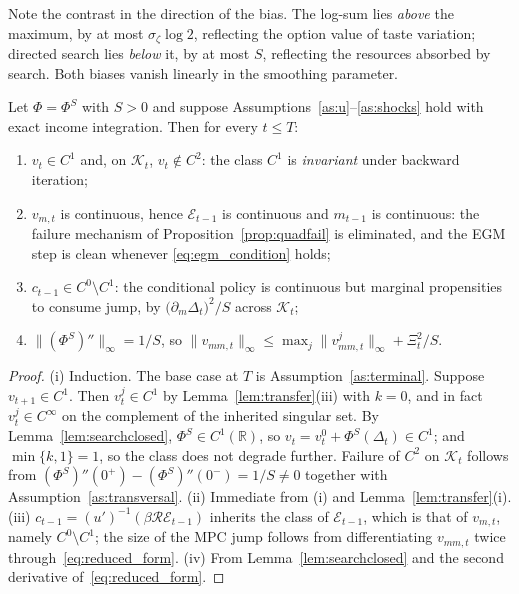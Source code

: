 Note the contrast in the direction of the bias. The log-sum lies \emph{above} the
maximum, by at most $\sigma_\zeta\log 2$, reflecting the option value of taste
variation; directed search lies \emph{below} it, by at most $S$, reflecting the
resources absorbed by search. Both biases vanish linearly in the smoothing parameter.

\begin{proposition}
\label{prop:search}
Let $\Phi=\Phi^{S}$ with $S>0$ and suppose
Assumptions~\ref{as:u}--\ref{as:shocks} hold with exact income integration. Then for
every $t\le T$:
\begin{enumerate}
    \item $v_t\in C^{1}$ and, on $\mathcal{K}_t$, $v_t\notin C^{2}$: the class $C^{1}$
    is \emph{invariant} under backward iteration;
    \item $v_{m,t}$ is continuous, hence $\mathcal{E}_{t-1}$ is continuous and
    $m_{t-1}$ is continuous: the failure mechanism of
    Proposition~\ref{prop:quadfail} is eliminated, and the EGM step is clean whenever
    \eqref{eq:egm_condition} holds;
    \item $c_{t-1}\in C^{0}\setminus C^{1}$: the conditional policy is continuous but
    marginal propensities to consume jump, by
    $\big(\partial_m\Delta_t\big)^{2}/S$ across $\mathcal{K}_t$;
    \item $\|(\Phi^{S})''\|_{\infty}=1/S$, so
    $\|v_{mm,t}\|_{\infty}\le\max_j\|v_{mm,t}^{j}\|_{\infty}+\Xi_t^{2}/S$.
\end{enumerate}
\end{proposition}

\begin{proof}
(i) Induction. The base case at $T$ is Assumption~\ref{as:terminal}. Suppose
$v_{t+1}\in C^{1}$. Then $v_t^{j}\in C^{1}$ by Lemma~\ref{lem:transfer}(iii) with
$k=0$, and in fact $v_t^{j}\in C^{\infty}$ on the complement of the inherited singular
set. By Lemma~\ref{lem:searchclosed}, $\Phi^{S}\in C^{1}(\mathbb{R})$, so
$v_t=v_t^{0}+\Phi^{S}(\Delta_t)\in C^{1}$; and $\min\{k,1\}=1$, so the class does not
degrade further. Failure of $C^{2}$ on $\mathcal{K}_t$ follows from
$(\Phi^{S})''(0^{+})-(\Phi^{S})''(0^{-})=1/S\neq0$ together with
Assumption~\ref{as:transversal}. (ii) Immediate from (i) and
Lemma~\ref{lem:transfer}(i). (iii) $c_{t-1}=(u')^{-1}(\beta\mathcal{R}\mathcal{E}_{t-1})$
inherits the class of $\mathcal{E}_{t-1}$, which is that of $v_{m,t}$, namely
$C^{0}\setminus C^{1}$; the size of the MPC jump follows from differentiating
$v_{mm,t}$ twice through~\eqref{eq:reduced_form}. (iv) From
Lemma~\ref{lem:searchclosed} and the second derivative of~\eqref{eq:reduced_form}.
\end{proof}

